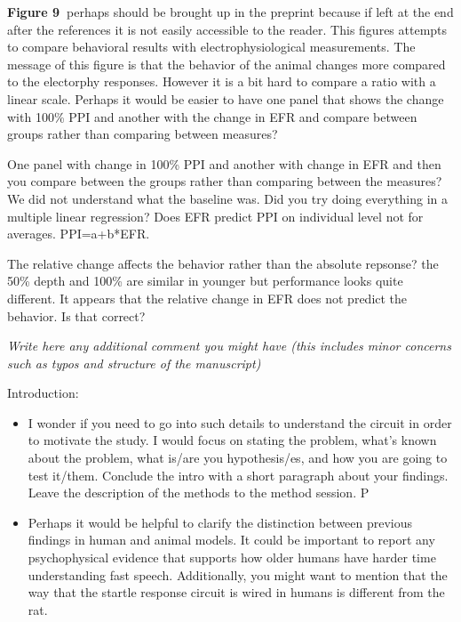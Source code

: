 \documentclass[10pt]{article}
\providecommand{\tightlist}{\setlength{\itemsep}{0pt}\setlength{\parskip}{0pt}}%
\begin{document}
\textbf{Figure 9~}perhaps should be brought up in the preprint because
if left at the end after the references it is not easily accessible to
the reader. This figures attempts to compare behavioral results with
electrophysiological measurements. The message of this figure is that
the behavior of the animal changes more compared to the electorphy
responses. However it is a bit hard to compare a ratio with a linear
scale. Perhaps it would be easier to have one panel that shows the
change with 100\% PPI and another with the change in EFR and compare
between groups rather than comparing between measures?~

One panel with change in 100\% PPI and another with change in EFR and
then you compare between the groups rather than comparing between the
measures? We did not understand what the baseline was. Did you try doing
everything in a multiple linear regression? Does EFR predict PPI on
individual level not for averages. PPI=a+b*EFR.~

The relative change affects the behavior rather than the absolute
repsonse? the 50\% depth and 100\% are similar in younger but
performance looks quite different. It appears that the relative change
in EFR does not predict the behavior. Is that correct?

\emph{Write here any additional comment you might have (this includes
minor concerns such as typos and structure of the manuscript)}

Introduction:

\begin{itemize}
\tightlist
\item
  I wonder if you need to go into such details to understand the circuit
  in order to motivate the study. I would focus on stating the problem,
  what's known about the problem, what is/are you hypothesis/es, and how
  you are going to test it/them. Conclude the intro with a short
  paragraph about your findings. Leave the description of the methods to
  the method session. P
\item
  Perhaps it would be helpful to clarify the distinction between
  previous findings in human and animal models. It could be important to
  report any psychophysical evidence that supports how older humans have
  harder time understanding fast speech. Additionally, you might want to
  mention that the way that the startle response circuit is wired in
  humans is different from the rat.~
\end{itemize}

\par\null\par\null







\textbf{}

\FloatBarrier
\end{document}
